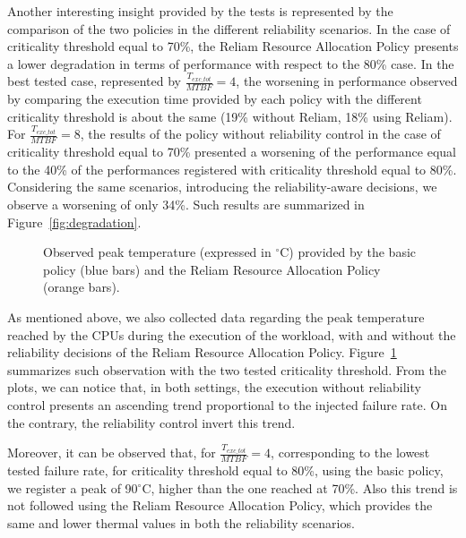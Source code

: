Another interesting insight provided by the tests is represented by the comparison of the two policies in the different reliability scenarios. In the case of criticality threshold equal to 70\%, the Reliam Resource Allocation Policy presents a lower degradation in terms of performance with respect to the 80\% case. In the best tested case, represented by $\frac{T_{exc\_tot}}{MTBF}=4$, the worsening in performance observed by comparing the execution time provided by each policy with the different criticality threshold is about the same (19\% without Reliam, 18\% using Reliam). For $\frac{T_{exc\_tot}}{MTBF}=8$, the results of the policy without reliability control in the case of criticality threshold equal to 70\% presented a worsening of the performance equal to the 40\% of the performances registered with criticality threshold equal to 80\%. Considering the same scenarios, introducing the reliability-aware decisions, we observe a worsening of only 34\%. Such results are summarized in Figure~\ref{fig:degradation}.


\begin{figure}[t]
    \centering
    \caption{Observed peak temperature (expressed in $^\circ$C) provided by the basic policy (blue bars) and the Reliam Resource Allocation Policy (orange bars).}
    \vspace{-0.4em}
    \label{fig:peak}%
\end{figure}

As mentioned above, we also collected data regarding the peak temperature reached by the CPUs during the execution of the workload, with and without the reliability decisions of the Reliam Resource Allocation Policy. Figure~\ref{fig:peak} summarizes such observation with the two tested criticality threshold. From the plots, we can notice that, in both settings, the execution without reliability control presents an ascending trend proportional to the injected failure rate. On the contrary, the reliability control invert this trend.

Moreover, it can be observed that, for $\frac{T_{exc\_tot}}{MTBF}=4$, corresponding to the lowest tested failure rate, for criticality threshold equal to 80\%, using the basic policy, we register a peak of 90$^\circ$C, higher than the one reached at 70\%. Also this trend is not followed using the Reliam Resource Allocation Policy, which provides the same and lower thermal values in both the reliability scenarios. 

